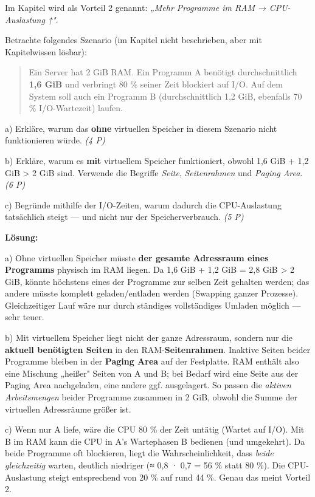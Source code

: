 \documentclass[11pt, a4paper]{article}
\begin{document}
Im Kapitel wird als Vorteil 2 genannt: \textit{„Mehr Programme im RAM → CPU-Auslastung ↑"}.


Betrachte folgendes Szenario (im Kapitel nicht beschrieben, aber mit Kapitelwissen lösbar):


\begin{quote}
Ein Server hat 2 GiB RAM. Ein Programm A benötigt durchschnittlich \textbf{1,6 GiB} und verbringt 80 \% seiner Zeit blockiert auf I/O. Auf dem System soll auch ein Programm B (durchschnittlich 1,2 GiB, ebenfalls 70 \% I/O-Wartezeit) laufen.
\end{quote}

a) Erkläre, warum das \textbf{ohne} virtuellen Speicher in diesem Szenario nicht funktionieren würde. \textit{(4 P)}


b) Erkläre, warum es \textbf{mit} virtuellem Speicher funktioniert, obwohl 1,6 GiB + 1,2 GiB > 2 GiB sind. Verwende die Begriffe \textit{Seite}, \textit{Seitenrahmen} und \textit{Paging Area}. \textit{(6 P)}


c) Begründe mithilfe der I/O-Zeiten, warum dadurch die CPU-Auslastung tatsächlich steigt — und nicht nur der Speicherverbrauch. \textit{(5 P)}


\textbf{Lösung:}


a) Ohne virtuellen Speicher müsste \textbf{der gesamte Adressraum eines Programms} physisch im RAM liegen. Da 1,6 GiB + 1,2 GiB = 2,8 GiB > 2 GiB, könnte höchstens eines der Programme zur selben Zeit gehalten werden; das andere müsste komplett geladen/entladen werden (Swapping ganzer Prozesse). Gleichzeitiger Lauf wäre nur durch ständiges vollständiges Umladen möglich — sehr teuer.


b) Mit virtuellem Speicher liegt nicht der ganze Adressraum, sondern nur die \textbf{aktuell benötigten Seiten} in den RAM-\textbf{Seitenrahmen}. Inaktive Seiten beider Programme bleiben in der \textbf{Paging Area} auf der Festplatte. RAM enthält also eine Mischung „heißer" Seiten von A und B; bei Bedarf wird eine Seite aus der Paging Area nachgeladen, eine andere ggf. ausgelagert. So passen die \textit{aktiven Arbeitsmengen} beider Programme zusammen in 2 GiB, obwohl die Summe der virtuellen Adressräume größer ist.


c) Wenn nur A liefe, wäre die CPU 80 \% der Zeit untätig (Wartet auf I/O). Mit B im RAM kann die CPU in A's Wartephasen B bedienen (und umgekehrt). Da beide Programme oft blockieren, liegt die Wahrscheinlichkeit, dass \textit{beide gleichzeitig} warten, deutlich niedriger (≈ 0,8 · 0,7 = 56 \% statt 80 \%). Die CPU-Auslastung steigt entsprechend von 20 \% auf rund 44 \%. Genau das meint Vorteil 2.
\end{document}
